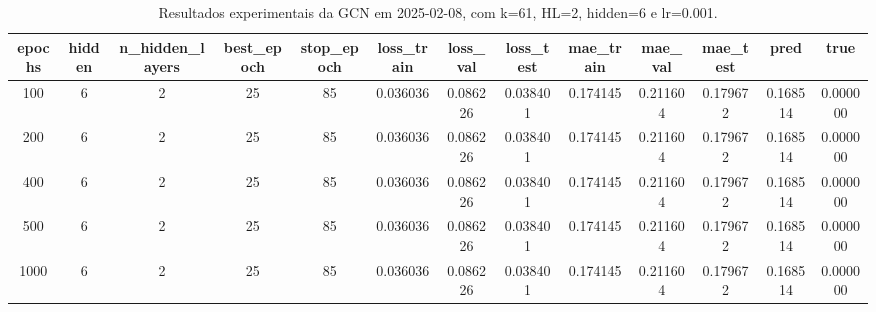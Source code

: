 \begin{table}[h]
\centering
\caption{Resultados experimentais da GCN em 2025-02-08, com k=61, HL=2, hidden=6 e lr=0.001.}
\label{tab:gcn_results_k61_hl2_h6_d20250208}
\begin{tabular}{ccccccccccccc}
\toprule
epochs & hidden & n\_hidden\_layers & best\_epoch & stop\_epoch & loss\_train & loss\_val & loss\_test & mae\_train & mae\_val & mae\_test & pred & true \\
\midrule
100 & 6 & 2 & 25 & 85 & 0.036036 & 0.086226 & 0.038401 & 0.174145 & 0.211604 & 0.179672 & 0.168514 & 0.000000 \\
200 & 6 & 2 & 25 & 85 & 0.036036 & 0.086226 & 0.038401 & 0.174145 & 0.211604 & 0.179672 & 0.168514 & 0.000000 \\
400 & 6 & 2 & 25 & 85 & 0.036036 & 0.086226 & 0.038401 & 0.174145 & 0.211604 & 0.179672 & 0.168514 & 0.000000 \\
500 & 6 & 2 & 25 & 85 & 0.036036 & 0.086226 & 0.038401 & 0.174145 & 0.211604 & 0.179672 & 0.168514 & 0.000000 \\
1000 & 6 & 2 & 25 & 85 & 0.036036 & 0.086226 & 0.038401 & 0.174145 & 0.211604 & 0.179672 & 0.168514 & 0.000000 \\
\bottomrule
\end{tabular}
\end{table}
